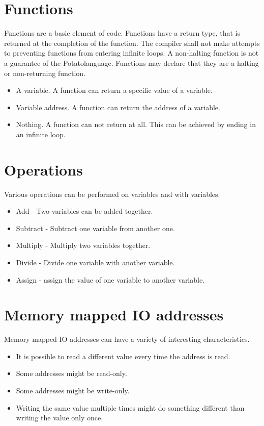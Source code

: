 \documentclass[12pt]{article}
\newcommand{\progLangNameSpace}{Potato\space }
\begin{document}
\section{ Functions}

Functions are a basic element of code. Functions have a return type, that is returned at the completion of the function. The compiler shall not make attempts to preventing functions from entering infinite loops. A non-halting function is not a guarantee of the \progLangNameSpace language. Functions may declare that they are a halting or non-returning function.

\begin{itemize}
\item A variable. A function can return a specific value of a variable.
\item Variable address. A function can return the address of a variable.
\item Nothing. A function can not return at all. This can be achieved by ending in an infinite loop.
\end{itemize}

\section { Operations }
Various operations can be performed on variables and with variables.
\begin{itemize}
\item Add - Two variables can be added together.
\item Subtract - Subtract one variable from another one.
\item Multiply - Multiply two variables together.
\item Divide - Divide one variable with another variable.
\item Assign - assign the value of one variable to another variable.
\end{itemize}

\section {Memory mapped IO addresses}

Memory mapped IO addresses can have a variety of interesting characteristics.

\begin{itemize}
\item It is possible to read a different value every time the address is read.
\item Some addresses might be read-only.
\item Some addresses might be write-only.
\item Writing the same value multiple times might do something different than writing the value only once.
\end{itemize}
\end{document}
